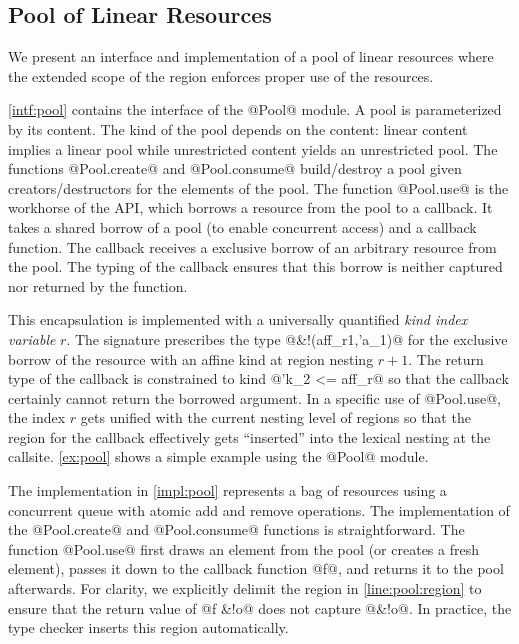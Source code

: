 \subsection{Pool of Linear Resources}
\label{tuto:pool}

We present an interface and implementation of a pool of linear resources where the
extended scope of the region enforces proper use of the resources.

\cref{intf:pool} contains the interface of the @Pool@ module.
A pool is parameterized by its content. The kind of the pool
depends on the content: linear content implies
a linear pool while unrestricted content yields an unrestricted pool.
The functions @Pool.create@ and @Pool.consume@
build/destroy a pool given creators/destructors for the elements
of the pool.
The function @Pool.use@ is the workhorse of the API, which
borrows a resource from the pool to a callback.
It takes a shared borrow of a pool (to enable concurrent access) and a
callback function.
The callback receives a exclusive borrow of an arbitrary resource from the pool.
The typing of the callback ensures
that this borrow is neither captured nor returned by the function.

This encapsulation is implemented with a universally quantified \emph{kind index variable} $r$.
The signature prescribes the type @&!(aff_r1,'a_1)@ for the
exclusive borrow of the resource with an affine kind at region nesting $r+1$. The return
type of the callback is constrained to kind @'k_2 <= aff_r@
so that the callback certainly cannot return the borrowed argument.
In a specific use of @Pool.use@, the index $r$ gets unified
with the current nesting level of regions so that the region for the
callback effectively gets ``inserted'' into the lexical nesting at the callsite.
%
\cref{ex:pool} shows a simple example using the @Pool@ module.

The implementation in \cref{impl:pool} represents a bag of resources
using a concurrent queue with atomic add and remove operations.
The implementation of the @Pool.create@ and @Pool.consume@
functions is straightforward.
The function @Pool.use@ first draws
an element from the pool (or creates a fresh element),
passes it down to the callback function @f@, and returns
it to the pool afterwards.
For clarity,
we explicitly delimit the region in \cref{line:pool:region} to ensure that
the return value of @f &!o@ does not capture @&!o@.
In practice, the type checker inserts this region automatically.

